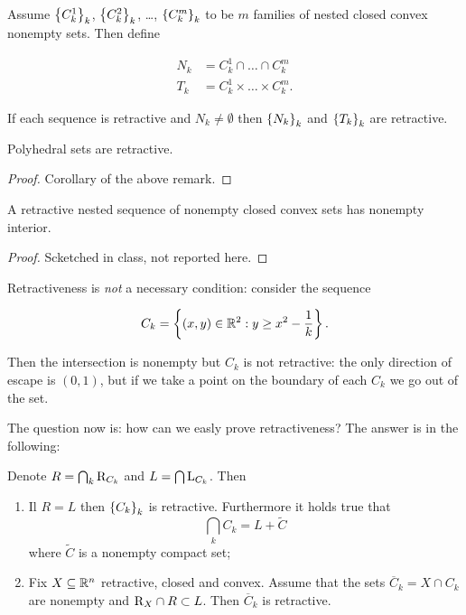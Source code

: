 \begin{remark}
    
    Assume $\left\{ C_k^1 \right\}_k$, $\left\{ C_k^2 \right\}_k$, \dots, $\left\{ C_k^m \right\}_k$ to be $m$ families of nested closed convex nonempty sets. Then define

    \begin{align*}
        N_k &= C_k^1 \cap \dots \cap C_k^m \\
        T_k &= C_k^1 \times \dots \times C_k^m.
    \end{align*}

    If each sequence is retractive and $N_k \neq \emptyset$ then $\left\{ N_k \right\}_k$ and $\left\{ T_k \right\}_k$ are retractive.

\end{remark}

\begin{proposition}
    Polyhedral sets are retractive.
\end{proposition}

\begin{proof}
    Corollary of the above remark.
\end{proof}

\begin{proposition}
    A retractive nested sequence of nonempty closed convex sets has nonempty interior.
\end{proposition}

\begin{proof}
    Scketched in class, not reported here.
\end{proof}

\begin{example}
    
    Retractiveness is \emph{not} a necessary condition: consider the sequence

    \[ C_k = \left\{ (x,y) \in \mathbb{R}^2 : y \ge x^2 - \frac1k \right\}. \]

    Then the intersection is nonempty but $C_k$ is not retractive: the only direction of escape is $(0,1)$, but if we take a point on the boundary of each $C_k$ we go out of the set.

\end{example}

The question now is: how can we easly prove retractiveness? The answer is in the following:

\begin{proposition}[Book 1.4.11]
    
    Denote $R = \bigcap_k \mathrm{R}_{C_k}$ and $L = \bigcap \mathrm{L}_{C_k}$. Then 

    \begin{enumerate}
        \item[a)] Il $R = L$ then $\left\{ C_k \right\}_k$ is retractive. Furthermore it holds true that 
            \[ \bigcap_k C_k = L + \tilde{C} \]
            where $\tilde{C}$ is a nonempty compact set;
        \item[b)] Fix $X \subseteq {\mathbb{R}^n}$ retractive, closed and convex. Assume that the sets $\overline{C}_k = X \cap C_k$ are nonempty and $\mathrm{R}_{X} \cap R \subset L$. Then $\overline{C}_k$ is retractive.
    \end{enumerate}

\end{proposition}

